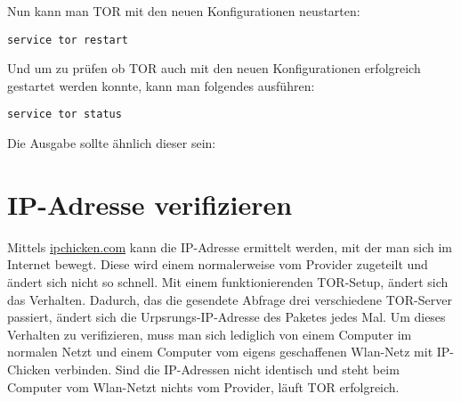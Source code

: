 Nun kann man TOR mit den neuen Konfigurationen neustarten:

\begin{lstlisting}
service tor restart
\end{lstlisting}

Und um zu prüfen ob TOR auch mit den neuen Konfigurationen erfolgreich gestartet werden konnte, kann man folgendes ausführen:

\begin{lstlisting}
service tor status
\end{lstlisting}

Die Ausgabe sollte ähnlich dieser sein:


\section{IP-Adresse verifizieren}
Mittels \url{ipchicken.com} kann die IP-Adresse ermittelt werden, mit der man sich im Internet bewegt. Diese wird einem normalerweise vom Provider zugeteilt und ändert sich nicht so schnell. Mit einem funktionierenden TOR-Setup, ändert sich das Verhalten. Dadurch, das die gesendete Abfrage drei verschiedene TOR-Server passiert, ändert sich die Urpsrungs-IP-Adresse des Paketes jedes Mal. Um dieses Verhalten zu verifizieren, muss man sich lediglich von einem Computer im normalen Netzt und einem Computer vom eigens geschaffenen Wlan-Netz mit IP-Chicken verbinden. Sind die IP-Adressen nicht identisch und steht beim Computer vom Wlan-Netzt nichts vom Provider, läuft TOR erfolgreich.

